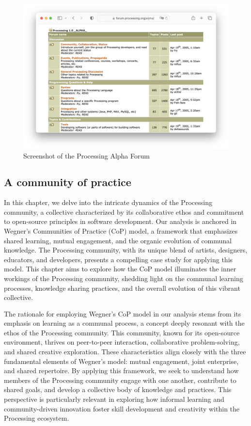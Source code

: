 
\begin{figure}
	\centering
	\includegraphics[width=1.0\textwidth]{images/alpha-browser.png}
	\caption{Screenshot of the Processing Alpha Forum}
	\label{fig:processing-alpha}
\end{figure}

\subsection{A community of practice}

In this chapter, we delve into the intricate dynamics of the Processing community, a collective characterized by its collaborative ethos and commitment to open-source principles in software development. Our analysis is anchored in Wegner's Communities of Practice (CoP) model, a framework that emphasizes shared learning, mutual engagement, and the organic evolution of communal knowledge. The Processing community, with its unique blend of artists, designers, educators, and developers, presents a compelling case study for applying this model. This chapter aims to explore how the CoP model illuminates the inner workings of the Processing community, shedding light on the communal learning processes, knowledge sharing practices, and the overall evolution of this vibrant collective.

The rationale for employing Wegner's CoP model in our analysis stems from its emphasis on learning as a communal process, a concept deeply resonant with the ethos of the Processing community. This community, known for its open-source environment, thrives on peer-to-peer interaction, collaborative problem-solving, and shared creative exploration. These characteristics align closely with the three fundamental elements of Wegner's model: mutual engagement, joint enterprise, and shared repertoire. By applying this framework, we seek to understand how members of the Processing community engage with one another, contribute to shared goals, and develop a collective body of knowledge and practices. This perspective is particularly relevant in exploring how informal learning and community-driven innovation foster skill development and creativity within the Processing ecosystem.


